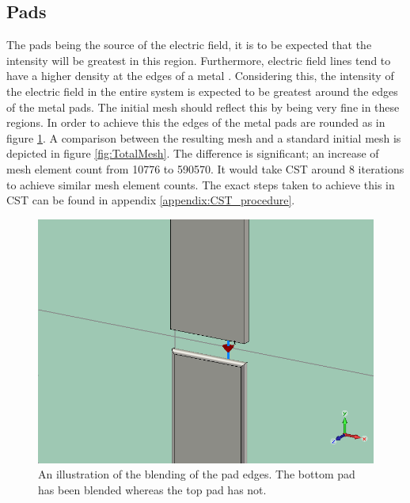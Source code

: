 \subsection{Pads}
The pads being the source of the electric field, it is to be expected that the intensity will be greatest in this region. Furthermore, electric field lines tend to have a higher density at the edges of a metal . Considering this, the intensity of the electric field in the entire system is expected to be greatest around the edges of the metal pads. The initial mesh should reflect this by being very fine in these regions. In order to achieve this the edges of the metal pads are rounded as in figure \ref{fig:blending4}. A comparison between the resulting mesh and a standard initial mesh is depicted in figure \ref{fig:TotalMesh}. The difference is significant; an increase of mesh element count from 10776 to 590570. It would take CST around 8 iterations to achieve similar mesh element counts. The exact steps taken to achieve this in CST can be found in appendix \ref{appendix:CST_procedure}. 

\begin{figure}
	\centering
	\includegraphics[scale=.5]{Figures/blending4}
	\caption{An illustration of the blending of the pad edges. The bottom pad has been blended whereas the top pad has not.}
	\label{fig:blending4}
\end{figure}

